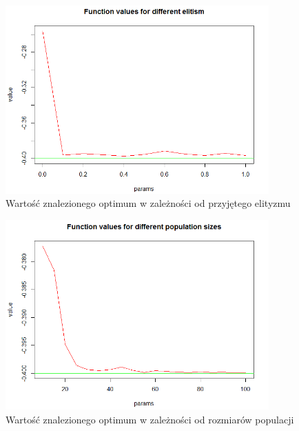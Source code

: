 \documentclass[11pt, a4paper]{article}
\begin{document}
\begin{figure}[H]
	\begin{center}
		\includegraphics[width=0.9\textwidth]{./assets/CosMix44.png} %
		\caption{Wartość znalezionego optimum w zależności od przyjętego elityzmu}
		\label{fig:cosmix44}
	\end{center}
\end{figure}

\begin{figure}[H]
	\begin{center}
		\includegraphics[width=0.9\textwidth]{./assets/CosMix45.png} %
		\caption{Wartość znalezionego optimum w zależności od rozmiarów populacji}
		\label{fig:cosmix45}
	\end{center}
\end{figure}
\end{document}
